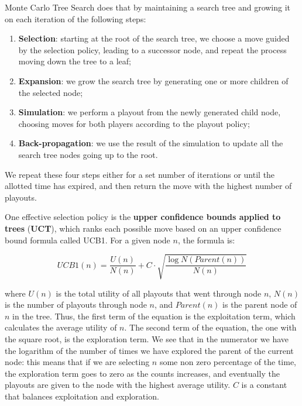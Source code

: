 \documentclass{article}
\begin{document}
Monte Carlo Tree Search does that by maintaining a search tree and growing it on each iteration of the following steps:
\begin{enumerate}
    \item \textbf{Selection}: starting at the root of the search tree, we choose a move guided by the selection policy, leading to a successor node, and repeat the process moving down the tree to a leaf;
    \item \textbf{Expansion}: we grow the search tree by generating one or more children of the selected node;
    \item \textbf{Simulation}: we perform a playout from the newly generated child node, choosing moves for both players according to the playout policy;
    \item \textbf{Back-propagation}: we use the result of the simulation to update all the search tree nodes going up to the root.
\end{enumerate}

We repeat these four steps either for a set number of iterations or until the allotted time has expired, and then return the move with the highest number of playouts.

One effective selection policy is the \textbf{upper confidence bounds applied to trees} (\textbf{UCT}), which ranks each possible move based on an upper confidence bound formula called UCB1. For a given node \(n\), the formula is:

\[UCB1(n) = \frac{U(n)}{N(n)}+C\cdot\sqrt{\frac{\log{N(Parent(n))}}{N(n)}}\]

\noindent where \(U(n)\) is the total utility of all playouts that went through node \(n\), \(N(n)\) is the number of playouts through node \(n\), and \(Parent(n)\) is the parent node of \(n\) in the tree. Thus, the first term of the equation is the exploitation term, which calculates the average utility of \(n\). The second term of the equation, the one with the square root, is the exploration term. We see that in the numerator we have the logarithm of the number of times we have explored the parent of the current node: this means that if we are selecting \(n\) some non zero percentage of the time, the exploration term goes to zero as the counts increases, and eventually the playouts are given to the node with the highest average utility. \(C\) is a constant that balances exploitation and exploration.
\end{document}

